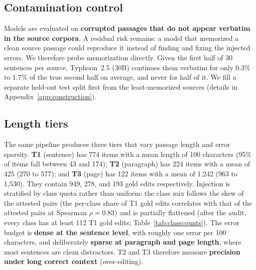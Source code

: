 \documentclass[11pt]{article}
\begin{document}
\subsection{Contamination control}
Models are evaluated on \textbf{corrupted passages that do not appear verbatim in the source
corpora}. A residual risk remains: a model that
memorized a clean source passage could reproduce it instead of finding and fixing the injected
errors. We therefore probe memorization directly. Given the first half of 30 sentences per
source, Typhoon~2.5 (30B) continues them verbatim for only 0.3\% to 1.7\% of the true second half
on average, and never for half of it. We fill a separate held-out test split first from the
least-memorized sources (details in Appendix~\ref{app:construction}).

\subsection{Length tiers}
\label{sec:tiers}
The same pipeline produces three tiers that vary passage length and error sparsity.
\textbf{T1} (sentence) has 774 items with a mean length of 100 characters (95\% of items fall
between 43 and 174); \textbf{T2} (paragraph) has 224 items with a mean of 425 (270 to 577); and
\textbf{T3} (page) has 122 items with a mean of 1{,}242 (963 to 1{,}530). They contain 949, 278,
and 193 gold edits respectively. Injection is stratified by class
quota rather than uniform: the class mix follows the skew of the attested pairs (the per-class
share of T1 gold edits correlates with that of the attested pairs at Spearman $\rho = 0.83$) and
is partially flattened (after the audit, every class has at least 112 T1 gold edits;
Table~\ref{tab:classcounts}). The error budget is \textbf{dense at the sentence level},
with roughly one error per 100 characters, and deliberately \textbf{sparse at paragraph and page
length}, where most sentences are clean distractors. T2 and T3 therefore measure
\textbf{precision under long correct context} (over-editing).
\end{document}
